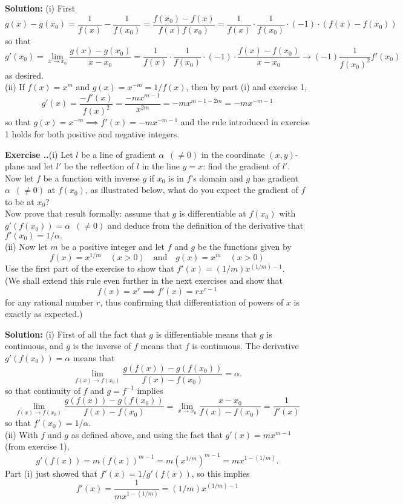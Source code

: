 \documentclass{article}
\newcounter{chapter}[section] %
\newcounter{example}[chapter]
\newcommand{\solution}[1]{\setlength{\hangindent}{\parindent} \indent\indent \textbf{Solution: }#1\hfill\break}
\newcommand{\exercise}[1]{
	
	\refstepcounter{example}
    \hangafter=1
    \setlength{\hangindent}{ 
    	\widthof{
			\large\textbf{Exercise \thesection.\thechapter.\theexample\enspace}
    	}-.5\parindent
    }
    {\setlength{\parindent}{0in}\large\textbf{Exercise \thesection.\thechapter.\theexample\enspace}#1}\hfill\break\par
}
\begin{document}
\solution{(i) First
$$g(x) -g(x_0) = \frac{1}{f(x)} - \frac{1}{f(x_0)} = \frac{f(x_0) - f(x)}{f(x)f(x_0)} = \frac{1}{f(x)}\cdot \frac{1}{f(x_0)}\cdot (-1)\cdot (f(x)-f(x_0))$$
so that 
$$g'(x_0) = \lim_{x\to x_0} \frac{g(x)-g(x_0)}{x-x_0} = \frac{1}{f(x)}\cdot \frac{1}{f(x_0)}\cdot (-1) \cdot \frac{f(x)-f(x_0)}{x-x_0}\to (-1)\frac{1}{f(x_0)^2} f'(x_0)$$
as desired. \\
\indent (ii) If $f(x) = x^m$ and $g(x) = x^{-m} = 1/f(x)$, then by part (i) and exercise 1,
$$g'(x) = \frac{-f'(x)}{f(x)^2}=\frac{-mx^{m-1}}{x^{2m}} = -mx^{m-1-2m} = -mx^{-m-1}$$
so that $g(x) = x^{-m} \implies f'(x) = -mx^{-m-1}$ and the rule introduced in exercise 1 holds for both positive and negative integers.} %
\exercise{(i) Let $l$ be a line of gradient $\alpha\enspace (\neq 0)$ in the coordinate $(x,y)$-plane and let $l'$ be the reflection of $l$ in the line $y=x$: find the gradient of $l'$.\\
\indent Now let $f$ be a function with inverse $g$ if $x_0$ is in $f$'s domain and $g$ has gradient $\alpha \enspace (\neq 0)$ at $f(x_0)$, as illustrated below, what do you expect the gradient of $f$ to be at $x_0$? \\
\indent Now prove that result formally: assume that $g$ is differentiable at $f(x_0)$ with $g'(f(x_0)) = \alpha \enspace(\neq 0)$ and deduce from the definition of the derivative that $f'(x_0) = 1/\alpha.$ \\
\indent (ii) Now let $m$ be a positive integer and let $f$ and $g$ be the functions given by 
$$f(x) = x^{1/m} \quad (x>0) \quad \text{and} \quad g(x) = x^m \quad (x>0)$$
Use the first part of the exercise to show that $f'(x) = (1/m)x^{(1/m)-1}$.\\
\indent (We shall extend this rule even further in the next exercises and show that 
$$f(x) = x^r \implies f'(x) = rx^{r-1}$$
for any rational number $r$, thus confirming that differentiation of powers of $x$ is exactly as expected.)} %
\solution{(i) First of all the fact that $g$ is differentiable means that $g$ is continuous, and $g$ is the inverse of $f$ means that $f$ is continuous. The derivative $g'(f(x_0)) = \alpha$ means that
$$\lim_{f(x)\to f(x_0)} \frac{g(f(x)) - g(f(x_0))}{f(x)-f(x_0)} = \alpha. $$ 
so that continuity of $f$ and $g = f^{-1}$ implies 
$$\lim_{f(x)\to f(x_0)} \frac{g(f(x))-g(f(x_0))}{f(x)-f(x_0)} = \lim_{x\to x_0} \frac{x-x_0}{f(x)-f(x_0)}= \frac{1}{f'(x)} $$ 
so that $f'(x_0) = 1/\alpha$. \\
\indent (ii) With $f$ and $g$ as defined above, and using the fact that $g'(x) = mx^{m-1}$ (from exercise 1),
$$g'(f(x)) = m(f(x))^{m-1} = m(x^{1/m})^{m-1} = mx^{1-(1/m)}.$$
Part (i) just showed that $f'(x) = 1/g'(f(x))$, so this implies 
$$f'(x) = \frac{1}{mx^{1-(1/m)}} = (1/m)x^{(1/m)-1}$$}%
\end{document}
